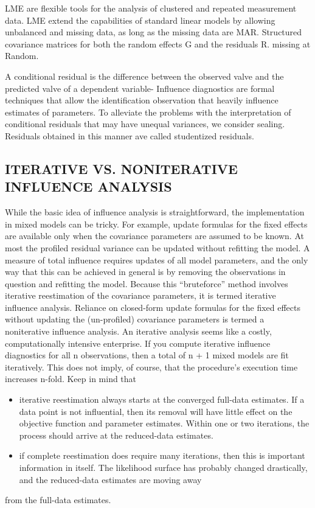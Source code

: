\documentclass[]{article}
\begin{document}
 
LME are flexible tools for the analysis of clustered and repeated measurement data. LME extend the capabilities of standard linear models by allowing unbalanced and missing data, as long as the missing data are MAR. Structured covariance matrices for both the random effects G and the residuals R. missing at Random.
 
A conditional residual is the difference between the observed valve and the predicted valve of a dependent variable- Influence diagnostics are formal techniques that allow the identification observation that heavily influence estimates of parameters.
To alleviate the problems with the interpretation of conditional residuals that may have unequal variances, we consider sealing.
Residuals obtained in this manner ave called studentized residuals.



\subsection{ITERATIVE VS. NONITERATIVE INFLUENCE ANALYSIS}
While the basic idea of influence analysis is straightforward, the implementation in mixed models can be
tricky. For example, update formulas for the fixed effects are available only when the covariance parameters
are assumed to be known. At most the profiled residual variance can be updated without refitting the model.
A measure of total influence requires updates of all model parameters, and the only way that this can be
achieved in general is by removing the observations in question and refitting the model. Because this “bruteforce”
method involves iterative reestimation of the covariance parameters, it is termed iterative influence
analysis. Reliance on closed-form update formulas for the fixed effects without updating the (un-profiled)
covariance parameters is termed a noniterative influence analysis.
An iterative analysis seems like a costly, computationally intensive enterprise. If you compute iterative
influence diagnostics for all n observations, then a total of n + 1 mixed models are fit iteratively. This does
not imply, of course, that the procedure’s execution time increases n-fold. Keep in mind that
\begin{itemize}
\item iterative reestimation always starts at the converged full-data estimates. If a data point is not influential,
then its removal will have little effect on the objective function and parameter estimates. Within
one or two iterations, the process should arrive at the reduced-data estimates.
\item if complete reestimation does require many iterations, then this is important information in itself. The
likelihood surface has probably changed drastically, and the reduced-data estimates are moving away
\end{itemize}
from the full-data estimates.

\end{document}
